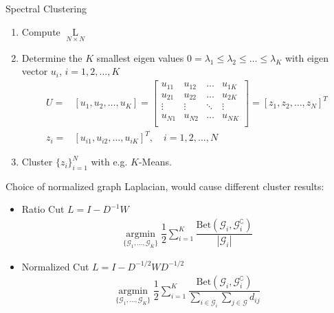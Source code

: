 \begin{algorithm}{Spectral Clustering}
    \begin{enumerate}[topsep=2pt,itemsep=2pt]
        \item Compute $ \mathop{L}\limits_{N\times N}  $
        \item Determine the $ K $ smallest eigen values $ 0=\lambda _1\leq \lambda _2\leq\ldots \leq \lambda _K $ with eigen vector $ u_i $, $ i=1,2,\ldots,K $
        \begin{align}
            U=&[u_1,u_2,\ldots,u_K]=\begin{bmatrix}
            u_{11}&u_{12}&\ldots&u_{1K}\\
            u_{21}&u_{22}&\ldots&u_{2K}\\
            \vdots&\vdots&\ddots&\vdots\\
            u_{N1}&u_{N2}&\ldots&u_{NK}\\
            \end{bmatrix} 
            =[z_1,z_2,\ldots,z_N]^T\\
            z_i=&[u_{i1},u_{i2},\ldots,u_{iK}]^T,\quad i=1,2,\ldots,N
        \end{align}
    
        \item Cluster $ \{z_i\}_{i=1}^N$ with e.g. $ K $-Means.
    \end{enumerate}
    
        
\end{algorithm}


    Choice of normalized graph Laplacian, would cause different cluster results:
\begin{itemize}[topsep=2pt,itemsep=0pt]
    \item Ratio Cut $ L=I-D^{-1}W $
    \begin{align}
        \mathop{\arg\min}\limits_{\{\mathcal{G}_1,\ldots,\mathcal{G}_K\}}\dfrac{1}{2}\sum_{i=1}^K\dfrac{\mathrm{Bet}(\mathcal{G}_i,\mathcal{G}_{i}^\complement)}{|\mathcal{G}_i|}  
    \end{align}
    \item Normalized Cut $ L=I-D^{-1/2}WD^{-1/2} $
    \begin{align}
        \mathop{\arg\min}\limits_{\{\mathcal{G}_1,\ldots,\mathcal{G}_K\}}\dfrac{1}{2}\sum_{i=1}^K\dfrac{\mathrm{Bet}(\mathcal{G}_i,\mathcal{G}_{i}^\complement)}{\sum_{i\in\mathcal{G}_i}\sum_{j\in\mathcal{G}}d_{ij}}  
    \end{align}
    
\end{itemize}

